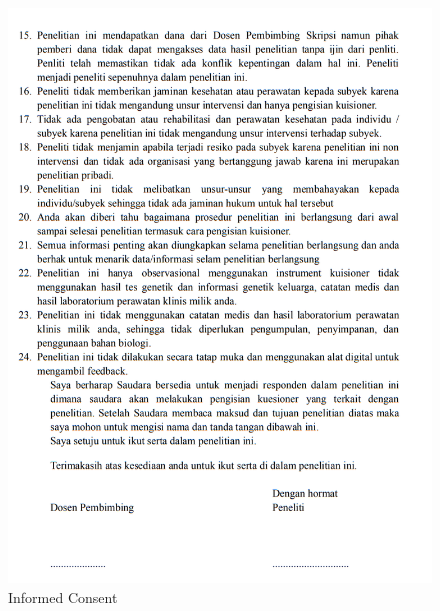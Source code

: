\begin{figure}[H]
	\centering
	\includegraphics[width=\textwidth]{contents/appendix/Inform2.png}
	\caption{Informed Consent}
	\label{Fig:Informed Concent2}
\end{figure}